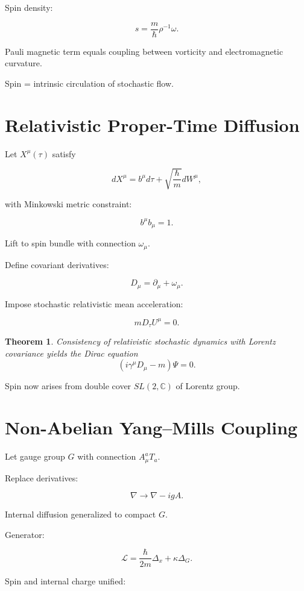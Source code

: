 \documentclass[12pt]{article}
\newtheorem{theorem}{Theorem}
\begin{document}
Spin density:

\[
s = \frac{m}{\hbar}\rho^{-1}\omega.
\]

Pauli magnetic term equals coupling between vorticity
and electromagnetic curvature.

Spin = intrinsic circulation of stochastic flow.

\section{Relativistic Proper-Time Diffusion}

Let $X^\mu(\tau)$ satisfy

\[
dX^\mu = b^\mu d\tau
+ \sqrt{\frac{\hbar}{m}} dW^\mu,
\]

with Minkowski metric constraint:

\[
b^\mu b_\mu = 1.
\]

Lift to spin bundle with connection $\omega_\mu$.

Define covariant derivatives:

\[
D_\mu = \partial_\mu + \omega_\mu.
\]

Impose stochastic relativistic mean acceleration:

\[
m D_\tau U^\mu = 0.
\]

\begin{theorem}
Consistency of relativistic stochastic dynamics
with Lorentz covariance yields the Dirac equation
\[
(i\gamma^\mu D_\mu - m)\Psi=0.
\]
\end{theorem}

Spin now arises from double cover
$SL(2,\mathbb{C})$ of Lorentz group.

\section{Non-Abelian Yang–Mills Coupling}

Let gauge group $G$ with connection $A_\mu^a T_a$.

Replace derivatives:

\[
\nabla \to \nabla - ig A.
\]

Internal diffusion generalized to compact $G$.

Generator:

\[
\mathcal{L}
=
\frac{\hbar}{2m}\Delta_x
+
\kappa \Delta_G.
\]

Spin and internal charge unified:
\end{document}

